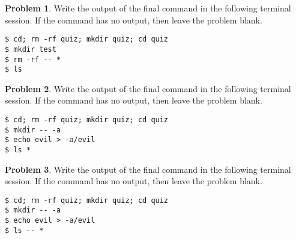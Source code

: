 \documentclass[10pt]{article}
\theoremstyle{definition}
\newtheorem{problem}{Problem}
\begin{document}
\filbreak
\begin{problem}
    Write the output of the final command in the following terminal session.
    If the command has no output, then leave the problem blank.
\end{problem}
\begin{lstlisting}
$ cd; rm -rf quiz; mkdir quiz; cd quiz
$ mkdir test
$ rm -rf -- *
$ ls
\end{lstlisting}

\filbreak
\begin{problem}
    Write the output of the final command in the following terminal session.
    If the command has no output, then leave the problem blank.
\end{problem}
\begin{lstlisting}
$ cd; rm -rf quiz; mkdir quiz; cd quiz
$ mkdir -- -a
$ echo evil > -a/evil
$ ls *
\end{lstlisting}

\filbreak
\begin{problem}
    Write the output of the final command in the following terminal session.
    If the command has no output, then leave the problem blank.
\end{problem}
\begin{lstlisting}
$ cd; rm -rf quiz; mkdir quiz; cd quiz
$ mkdir -- -a
$ echo evil > -a/evil
$ ls -- *
\end{lstlisting}



\end{document}

